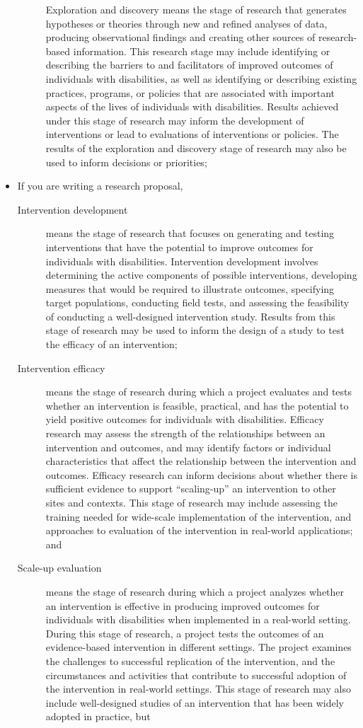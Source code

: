 \begin{itemize}
\begin{description}
    Exploration and discovery means the stage of research that generates hypotheses or theories through new and refined analyses of data, producing observational findings and creating other sources of research-based information. This research stage may include identifying or describing the barriers to and facilitators of improved outcomes of individuals with disabilities, as well as identifying or describing existing practices, programs, or policies that are associated with important aspects of the lives of individuals with disabilities. Results achieved under this stage of research may inform the development of interventions or lead to evaluations of interventions or policies. The results of the exploration and discovery stage of research may also be used to inform decisions or priorities;
        \end{description}
  \item If you are writing a research proposal,
  \begin{description}
   \item[Intervention development] means the stage of research that focuses on generating and testing interventions that have the potential to improve outcomes for individuals with disabilities. Intervention development involves determining the active components of possible interventions, developing measures that would be required to illustrate outcomes, specifying target populations, conducting field tests, and assessing the feasibility of conducting a well-designed
intervention study. Results from this stage of research may be used to inform the design of a study to test the efficacy of an intervention;
   \item[ Intervention efficacy] means the stage of research during which a project evaluates and tests whether an intervention is feasible, practical, and has the potential to yield positive outcomes for individuals with disabilities. Efficacy research may assess the strength of the relationships between an intervention and outcomes, and may identify factors or individual characteristics that affect the relationship between the intervention and outcomes. Efficacy research can inform decisions about whether there is sufficient evidence to support “scaling-up” an intervention to other sites and contexts. This stage of research may include assessing the training needed for wide-scale implementation of the intervention, and approaches to evaluation of the intervention in real-world applications; and
  \item[ Scale-up evaluation] means the stage of research during which a project analyzes whether an intervention is effective in producing improved outcomes for individuals with disabilities when implemented in a real-world setting. During this stage of research, a project tests the outcomes of an evidence-based intervention in different settings. The project examines the challenges to successful replication of the intervention, and the circumstances and activities that contribute to successful adoption of the intervention in real-world settings. This stage of research may also include well-designed studies of an intervention that has been widely adopted in practice, but

\end{description}
\end{itemize}
